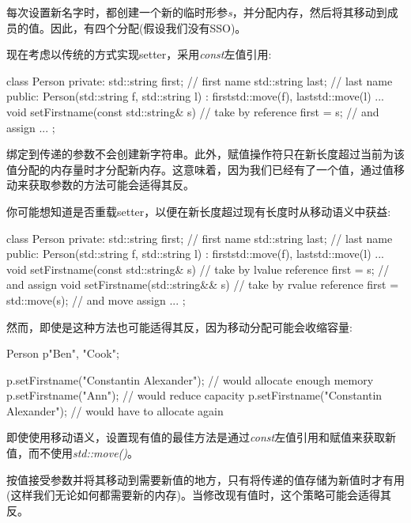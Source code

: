 每次设置新名字时，都创建一个新的临时形参\textit{s}，并分配内存，然后将其移动到成员的值。因此，有四个分配(假设我们没有SSO)。\par

现在考虑以传统的方式实现setter，采用\textit{const}左值引用:\par

\begin{codebox}[cpp]
class Person {
private:
  std::string first; // first name
  std::string last; // last name
public:
  Person(std::string f, std::string l)
  : first{std::move(f)}, last{std::move(l)} {
  }
  ...
  void setFirstname(const std::string& s) { // take by reference
    first = s; // and assign
  }
  ...
};
\end{codebox}

绑定到传递的参数不会创建新字符串。此外，赋值操作符只在新长度超过当前为该值分配的内存量时才分配新内存。这意味着，因为我们已经有了一个值，通过值移动来获取参数的方法可能会适得其反。\par

你可能想知道是否重载setter，以便在新长度超过现有长度时从移动语义中获益:\par

\begin{codebox}[cpp]
class Person {
private:
  std::string first; // first name
  std::string last; // last name
public:
  Person(std::string f, std::string l)
  : first{std::move(f)}, last{std::move(l)} {
  }
  ...
  void setFirstname(const std::string& s) { // take by lvalue reference
    first = s; // and assign
  }
  void setFirstname(std::string&& s) { // take by rvalue reference
    first = std::move(s); // and move assign
  }
  ...
};
\end{codebox}

然而，即使是这种方法也可能适得其反，因为移动分配可能会收缩容量:\par

\begin{codebox}[cpp]
Person p{"Ben", "Cook"};

p.setFirstname("Constantin Alexander"); // would allocate enough memory
p.setFirstname("Ann"); // would reduce capacity
p.setFirstname("Constantin Alexander"); // would have to allocate again
\end{codebox}

即使使用移动语义，设置现有值的最佳方法是通过\textit{const}左值引用和赋值来获取新值，而不使用\textit{std::move()}。\par

按值接受参数并将其移动到需要新值的地方，只有将传递的值存储为新值时才有用(这样我们无论如何都需要新的内存)。当修改现有值时，这个策略可能会适得其反。\par

